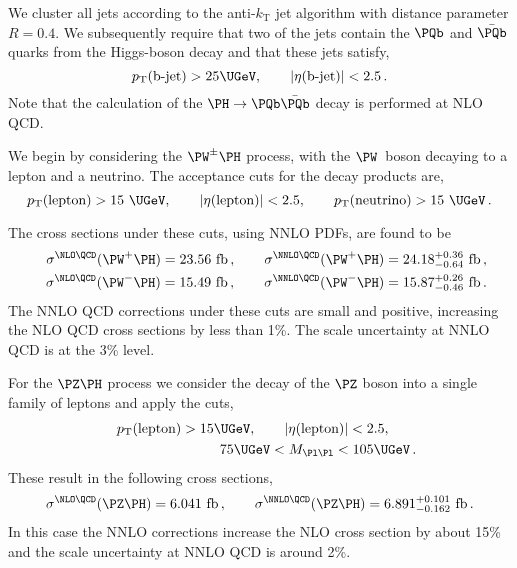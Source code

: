 We cluster all jets according to the anti-$k_{\mathrm{T}}$ jet algorithm
with distance parameter $R=0.4$.  We subsequently require that two of
the jets contain the $\PQb$ and $\bar \PQb$ quarks from the Higgs-boson decay
and that these jets satisfy,
\begin{equation}
p_{\mathrm{T}}(\mbox{\rm b-jet}) > 25\UGeV, \qquad
|\eta(\mbox{\rm b-jet})| < 2.5 \,.
\end{equation}
Note that the calculation of the $\PH \to \PQb\bar \PQb$ decay is performed at NLO QCD.

We begin by considering the $\PW^\pm \PH$ process, with the $\PW$~boson
decaying to a lepton and a neutrino.  The acceptance cuts for the
decay products are,
\begin{equation}
p_{\mathrm{T}}(\mbox{lepton}) > 15~\UGeV, \qquad
|\eta(\mbox{lepton})| < 2.5, \qquad
p_{\mathrm{T}}(\mbox{neutrino}) > 15~\UGeV \,.
\end{equation}

The cross sections under these cuts, using NNLO PDFs, are found to be
\begin{eqnarray}
&&
\sigma^{\NLO \QCD}(\PW^+\PH) = 23.56~\mathrm{fb} \,, \qquad
\sigma^{\NNLO \QCD}(\PW^+\PH) = 24.18^{+0.36}_{-0.64}~\mathrm{fb} \,, \nonumber \\
&&
\sigma^{\NLO \QCD}(\PW^-\PH) = 15.49~\mathrm{fb} \,, \qquad
\sigma^{\NNLO \QCD}(\PW^-\PH) = 15.87^{+0.26}_{-0.46}~\mathrm{fb} \,.
\end{eqnarray}
The NNLO QCD corrections under these cuts are small and positive, increasing
the NLO QCD cross sections by less than 1\%.  The scale uncertainty at NNLO QCD
is at the 3\% level.

For the $\PZ\PH$ process we consider the decay of the $\PZ$ boson into a single
family of leptons and apply the cuts,
\begin{eqnarray}
&&
p_{\mathrm{T}}(\mbox{lepton}) > 15\UGeV, \qquad
|\eta(\mbox{lepton})| < 2.5, \qquad \nonumber \\
&&
75\UGeV < M_{\Pl\Pl} < 105\UGeV \,.
\end{eqnarray}
These result in the following cross sections,
\begin{equation}
\sigma^{\NLO \QCD}(\PZ\PH) = 6.041~\mathrm{fb} \,, \qquad
\sigma^{\NNLO \QCD}(\PZ\PH) = 6.891^{+0.101}_{-0.162}~\mathrm{fb} \,.
\end{equation}
In this case the NNLO corrections increase the NLO cross section by
about 15\% and the scale uncertainty at NNLO QCD is around 2\%.

